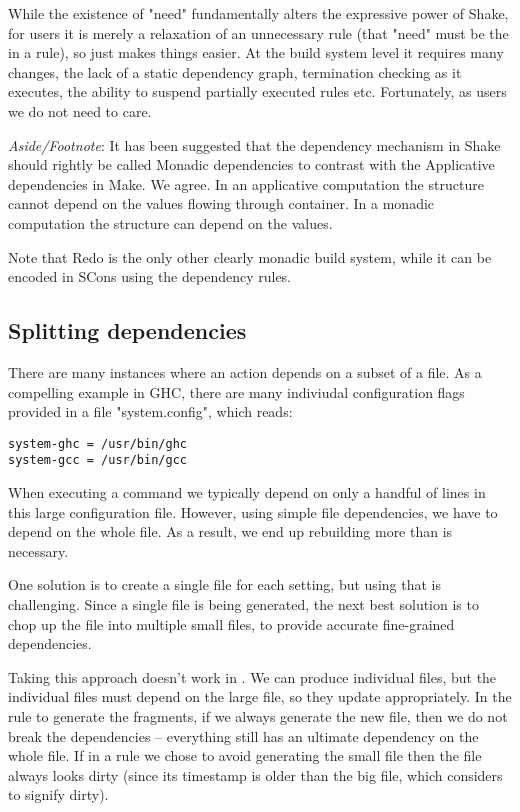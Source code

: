 While the existence of \lst"need" fundamentally alters the expressive power of Shake, for users it is merely a relaxation of an unnecessary rule (that \lst"need" must be the in a rule), so just makes things easier. At the build system level it requires many changes, the lack of a static dependency graph, termination checking as it executes, the ability to suspend partially executed rules etc. Fortunately, as users we do not need to care.

\textit{Aside/Footnote}: It has been suggested that the dependency mechanism in Shake should rightly be called Monadic dependencies to contrast with the Applicative dependencies in Make. We agree. In an applicative computation the structure cannot depend on the values flowing through container. In a monadic computation the structure can depend on the values.

Note that Redo is the only other clearly monadic build system, while it can be encoded in SCons using the dependency rules.

\subsection{Splitting dependencies}

There are many instances where an action depends on a subset of a file. As a compelling example in GHC, there are many indiviudal configuration flags provided in a file \lst"system.config", which reads:


\begin{lstlisting}
system-ghc = /usr/bin/ghc
system-gcc = /usr/bin/gcc
\end{lstlisting}

When executing a command we typically depend on only a handful of lines in this large configuration file. However, using simple file dependencies, we have to depend on the whole file. As a result, we end up rebuilding more than is necessary.

One solution is to create a single file for each setting, but using  that is challenging. Since a single file is being generated, the next best solution is to chop up the file into multiple small files, to provide accurate fine-grained dependencies.

Taking this approach doesn't work in \make{}. We can produce individual files, but the individual files must depend on the large file, so they update appropriately. In the rule to generate the fragments, if we always generate the new file, then we do not break the dependencies -- everything still has an ultimate dependency on the whole file. If in a rule we chose to avoid generating the small file then the file always looks dirty (since its timestamp is older than the big file, which \make{} considers to signify dirty).

